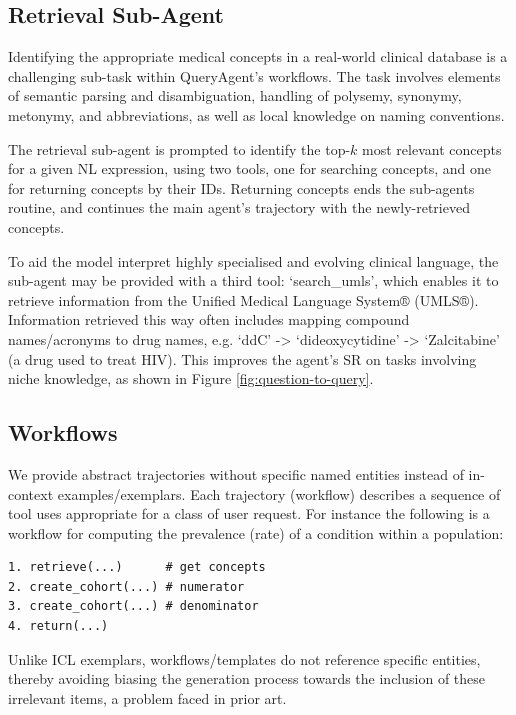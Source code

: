 \documentclass[11pt]{article}
\begin{document}
\subsection{Retrieval Sub-Agent}
Identifying the appropriate medical concepts in a real-world clinical database is a challenging sub-task within QueryAgent's workflows.
The task involves elements of semantic parsing and disambiguation, handling of polysemy, synonymy, metonymy, and abbreviations, as well as local knowledge on naming conventions.

The retrieval sub-agent is prompted to identify the top-$k$ most relevant concepts for a given NL expression, using two tools, one for searching concepts, and one for returning concepts by their IDs.
Returning concepts ends the sub-agents routine, and continues the main agent's trajectory with the newly-retrieved concepts.

To aid the model interpret highly specialised and evolving clinical language, the sub-agent may be provided with a third tool: `search\_umls', which enables it to retrieve information from the Unified Medical Language System® (UMLS®).
Information retrieved this way often includes mapping compound names/acronyms to drug names, e.g. `ddC' -> `dideoxycytidine' -> `Zalcitabine' (a drug used to treat HIV).
This improves the agent's SR on tasks involving niche knowledge, as shown in Figure \ref{fig:question-to-query}.

\subsection{Workflows}

We provide abstract trajectories without specific named entities instead of in-context examples/exemplars.
Each trajectory (workflow) describes a sequence of tool uses appropriate for a class of user request.
For instance the following is a workflow for computing the prevalence (rate) of a condition within a population:
\begin{verbatim}
1. retrieve(...)      # get concepts
2. create_cohort(...) # numerator
3. create_cohort(...) # denominator
4. return(...)
\end{verbatim}

Unlike ICL exemplars, workflows/templates do not reference specific entities, thereby avoiding biasing the generation process towards the inclusion of these irrelevant items, a problem faced in prior art.
\end{document}
